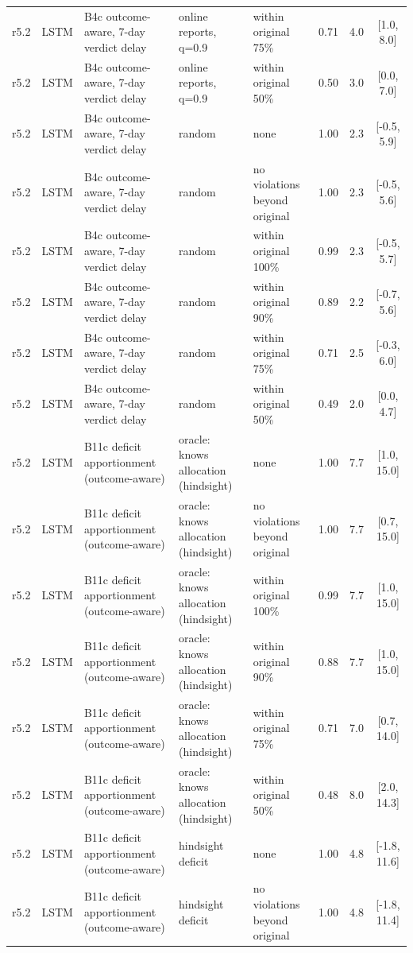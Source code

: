 \documentclass[10pt,onecolumn,letterpaper]{article}
\begin{document}
\begin{longtable}{lllp{4.2cm}p{3.4cm}ccc}
r5.2 & LSTM & B4c outcome-aware, 7-day verdict delay & online reports, q=0.9 & within original 75\% & 0.71 & 4.0 & [1.0, 8.0] \\
r5.2 & LSTM & B4c outcome-aware, 7-day verdict delay & online reports, q=0.9 & within original 50\% & 0.50 & 3.0 & [0.0, 7.0] \\
r5.2 & LSTM & B4c outcome-aware, 7-day verdict delay & random & none & 1.00 & 2.3 & [-0.5, 5.9] \\
r5.2 & LSTM & B4c outcome-aware, 7-day verdict delay & random & no violations beyond original & 1.00 & 2.3 & [-0.5, 5.6] \\
r5.2 & LSTM & B4c outcome-aware, 7-day verdict delay & random & within original 100\% & 0.99 & 2.3 & [-0.5, 5.7] \\
r5.2 & LSTM & B4c outcome-aware, 7-day verdict delay & random & within original 90\% & 0.89 & 2.2 & [-0.7, 5.6] \\
r5.2 & LSTM & B4c outcome-aware, 7-day verdict delay & random & within original 75\% & 0.71 & 2.5 & [-0.3, 6.0] \\
r5.2 & LSTM & B4c outcome-aware, 7-day verdict delay & random & within original 50\% & 0.49 & 2.0 & [0.0, 4.7] \\
r5.2 & LSTM & B11c deficit apportionment (outcome-aware) & oracle: knows allocation (hindsight) & none & 1.00 & 7.7 & [1.0, 15.0] \\
r5.2 & LSTM & B11c deficit apportionment (outcome-aware) & oracle: knows allocation (hindsight) & no violations beyond original & 1.00 & 7.7 & [0.7, 15.0] \\
r5.2 & LSTM & B11c deficit apportionment (outcome-aware) & oracle: knows allocation (hindsight) & within original 100\% & 0.99 & 7.7 & [1.0, 15.0] \\
r5.2 & LSTM & B11c deficit apportionment (outcome-aware) & oracle: knows allocation (hindsight) & within original 90\% & 0.88 & 7.7 & [1.0, 15.0] \\
r5.2 & LSTM & B11c deficit apportionment (outcome-aware) & oracle: knows allocation (hindsight) & within original 75\% & 0.71 & 7.0 & [0.7, 14.0] \\
r5.2 & LSTM & B11c deficit apportionment (outcome-aware) & oracle: knows allocation (hindsight) & within original 50\% & 0.48 & 8.0 & [2.0, 14.3] \\
r5.2 & LSTM & B11c deficit apportionment (outcome-aware) & hindsight deficit & none & 1.00 & 4.8 & [-1.8, 11.6] \\
r5.2 & LSTM & B11c deficit apportionment (outcome-aware) & hindsight deficit & no violations beyond original & 1.00 & 4.8 & [-1.8, 11.4] \\

\end{longtable}
\end{document}
